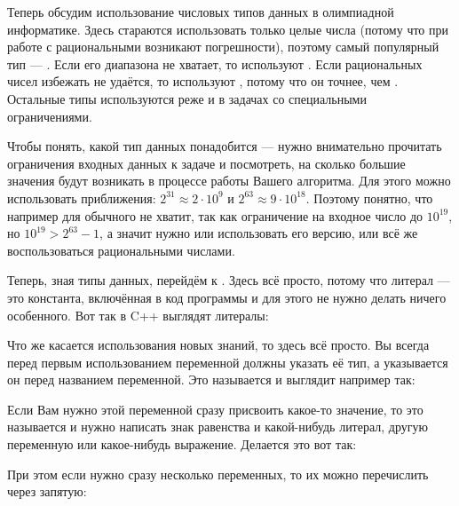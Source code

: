 Теперь обсудим использование числовых типов данных в олимпиадной информатике. Здесь стараются использовать только целые числа (потому что при работе с рациональными возникают погрешности), поэтому самый популярный тип — . Если его диапазона не хватает, то используют . Если рациональных чисел избежать не удаётся, то используют , потому что он точнее, чем . Остальные типы используются реже и в задачах со специальными ограничениями.

Чтобы понять, какой тип данных понадобится — нужно внимательно прочитать ограничения входных данных к задаче и посмотреть, на сколько большие значения будут возникать в процессе работы Вашего алгоритма. Для этого можно использовать приближения: $2^{31} \approx 2 \cdot 10^9$ и $2^{63} \approx 9 \cdot 10^{18}$. Поэтому понятно, что например для  обычного  не хватит, так как ограничение на входное число до $10^{19}$, но $10^{19} > 2^{63} - 1$, а значит нужно или использовать его  версию, или всё же воспользоваться рациональными числами.

Теперь, зная типы данных, перейдём к . Здесь всё просто, потому что литерал — это константа, включённая в код программы и для этого не нужно делать ничего особенного. Вот так в C++ выглядят литералы:


Что же касается использования новых знаний, то здесь всё просто. Вы всегда перед первым использованием переменной должны указать её тип, а указывается он перед названием переменной. Это называется  и выглядит например так:


Если Вам нужно этой переменной сразу присвоить какое-то значение, то это называется  и нужно написать знак равенства и какой-нибудь литерал, другую переменную или какое-нибудь выражение. Делается это вот так:


При этом если нужно сразу несколько переменных, то их можно перечислить через запятую:

